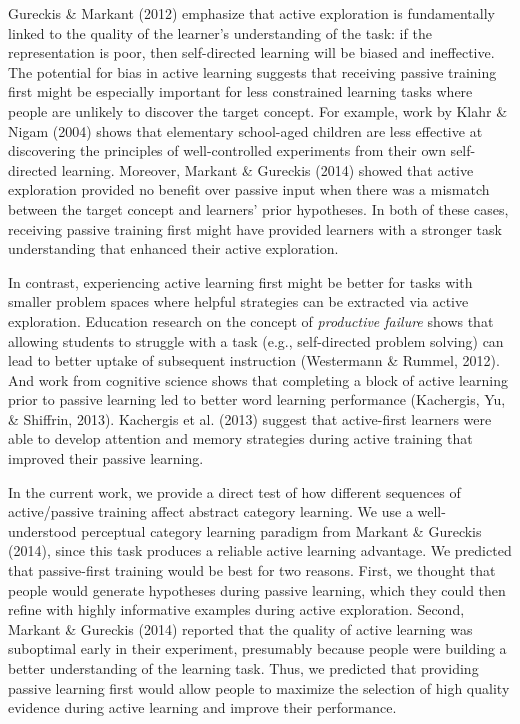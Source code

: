 \documentclass[10pt, letterpaper]{article}
\begin{document}
Gureckis \& Markant (2012) emphasize that active exploration is
fundamentally linked to the quality of the learner's understanding of
the task: if the representation is poor, then self-directed learning
will be biased and ineffective. The potential for bias in active
learning suggests that receiving passive training first might be
especially important for less constrained learning tasks where people
are unlikely to discover the target concept. For example, work by Klahr
\& Nigam (2004) shows that elementary school-aged children are less
effective at discovering the principles of well-controlled experiments
from their own self-directed learning. Moreover, Markant \& Gureckis
(2014) showed that active exploration provided no benefit over passive
input when there was a mismatch between the target concept and learners'
prior hypotheses. In both of these cases, receiving passive training
first might have provided learners with a stronger task understanding
that enhanced their active exploration.

In contrast, experiencing active learning first might be better for
tasks with smaller problem spaces where helpful strategies can be
extracted via active exploration. Education research on the concept of
\emph{productive failure} shows that allowing students to struggle with
a task (e.g., self-directed problem solving) can lead to better uptake
of subsequent instruction (Westermann \& Rummel, 2012). And work from
cognitive science shows that completing a block of active learning prior
to passive learning led to better word learning performance (Kachergis,
Yu, \& Shiffrin, 2013). Kachergis et al. (2013) suggest that
active-first learners were able to develop attention and memory
strategies during active training that improved their passive learning.

In the current work, we provide a direct test of how different sequences
of active/passive training affect abstract category learning. We use a
well-understood perceptual category learning paradigm from Markant \&
Gureckis (2014), since this task produces a reliable active learning
advantage. We predicted that passive-first training would be best for
two reasons. First, we thought that people would generate hypotheses
during passive learning, which they could then refine with highly
informative examples during active exploration. Second, Markant \&
Gureckis (2014) reported that the quality of active learning was
suboptimal early in their experiment, presumably because people were
building a better understanding of the learning task. Thus, we predicted
that providing passive learning first would allow people to maximize the
selection of high quality evidence during active learning and improve
their performance.
\end{document}
